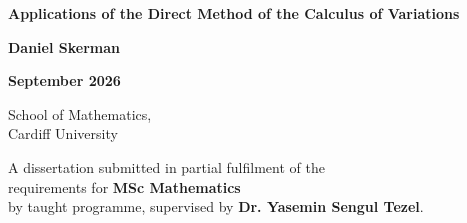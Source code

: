 \begin{titlepage}

\centering

\vspace*{3cm}

{\LARGE\bfseries Applications of the Direct Method of the Calculus of Variations\par}

\vspace{2cm}

{\Large \textbf{Daniel Skerman}\par}

\vspace{1cm}

{\Large \textbf{September 2026}\par}

\vspace{2cm}

{\large School of Mathematics,\\
Cardiff University\par}

\vfill

{\large
A dissertation submitted in partial fulfilment of the\\
requirements for \textbf{MSc Mathematics}\\
by taught programme, supervised by \textbf{Dr. Yasemin Sengul Tezel}.
\par}

\end{titlepage}